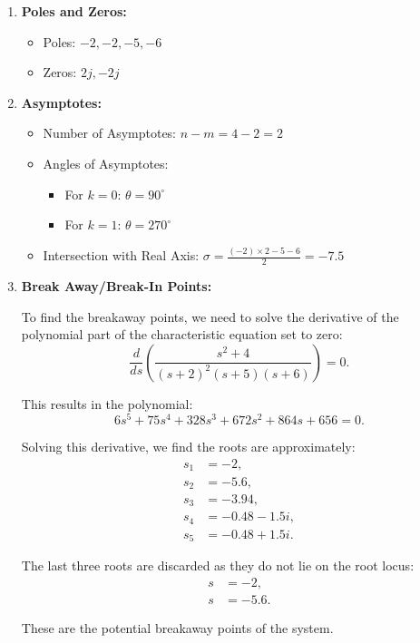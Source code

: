 \documentclass{article}
\begin{document}
\begin{enumerate}
    \item \textbf{Poles and Zeros:}
    \begin{itemize}
        \item Poles: \( -2, -2, -5, -6 \)
        \item Zeros: \( 2j, -2j \)
    \end{itemize}

    \item \textbf{Asymptotes:}
    \begin{itemize}
        \item Number of Asymptotes: \( n - m = 4 - 2 = 2 \)
        \item Angles of Asymptotes: 
        \begin{itemize}
            \item For \( k = 0 \): \( \theta = 90^\circ \)
            \item For \( k = 1 \): \( \theta = 270^\circ \)
        \end{itemize}
        \item Intersection with Real Axis: \( \sigma = \frac{(-2) \times 2 - 5 - 6}{2} = -7.5 \)
    \end{itemize}

    \item \textbf{Break Away/Break-In Points:}

To find the breakaway points, we need to solve the derivative of the polynomial part of the characteristic equation set to zero:
\[
\frac{d}{ds}\left( \frac{s^2+4}{(s+2)^2(s+5)(s+6)} \right) = 0.
\]

This results in the polynomial:
\[
6s^5 + 75s^4 + 328s^3 + 672s^2 + 864s + 656 = 0.
\]

Solving this derivative, we find the roots are approximately:
\begin{align*}
s_1 &= -2, \\
s_2 &= -5.6, \\
s_3 &= -3.94, \\
s_4 &= -0.48 - 1.5i, \\
s_5 &= -0.48 + 1.5i.
\end{align*}

The last three roots are discarded as they do not lie on the root locus:
\begin{align*}
s &= -2, \\
s &= -5.6.
\end{align*}

These are the potential breakaway points of the system.



\end{enumerate}
\end{document}
